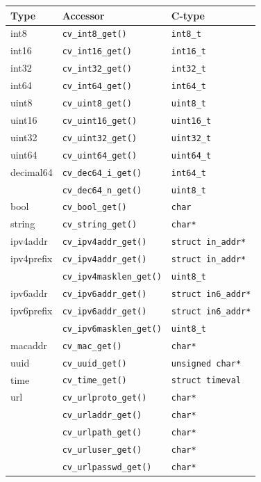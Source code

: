 \documentclass[a4paper, 10pt] {article}
\begin{document}
\begin{tabular}{ | l | l | l | }
\hline
  \textbf{ Type} & \textbf{Accessor} & \textbf{C-type}\\
\hline
int8   & {\tt cv\_int8\_get()}   & {\tt int8\_t} \\
int16  & {\tt cv\_int16\_get()}  & {\tt int16\_t} \\
int32  & {\tt cv\_int32\_get()}  & {\tt int32\_t} \\
int64  & {\tt cv\_int64\_get()}  & {\tt int64\_t} \\
uint8  & {\tt cv\_uint8\_get()}  & {\tt uint8\_t} \\
uint16 & {\tt cv\_uint16\_get()} & {\tt uint16\_t} \\
uint32 & {\tt cv\_uint32\_get()} & {\tt uint32\_t} \\
uint64 & {\tt cv\_uint64\_get()} & {\tt uint64\_t} \\
decimal64 & {\tt cv\_dec64\_i\_get()} & {\tt int64\_t}\\
           & {\tt cv\_dec64\_n\_get()} & {\tt uint8\_t}\\
bool & {\tt cv\_bool\_get()} & {\tt char} \\
string & {\tt cv\_string\_get()} & {\tt char*} \\
ipv4addr   & {\tt cv\_ipv4addr\_get()} & {\tt struct in\_addr*}\\
ipv4prefix & {\tt cv\_ipv4addr\_get()} & {\tt struct in\_addr*}\\
           & {\tt cv\_ipv4masklen\_get()} & {\tt uint8\_t}\\
ipv6addr   & {\tt cv\_ipv6addr\_get()} & {\tt struct in6\_addr*}\\
ipv6prefix & {\tt cv\_ipv6addr\_get()} & {\tt struct in6\_addr*}\\
           & {\tt cv\_ipv6masklen\_get()} & {\tt uint8\_t}\\
macaddr    & {\tt cv\_mac\_get()} & {\tt char*}\\
uuid       & {\tt cv\_uuid\_get()} & {\tt unsigned char*}\\
time       & {\tt cv\_time\_get()} & {\tt struct timeval}\\
url        & {\tt cv\_urlproto\_get()} & {\tt char*}\\
           & {\tt cv\_urladdr\_get()} & {\tt char*}\\
           & {\tt cv\_urlpath\_get()} & {\tt char*}\\
           & {\tt cv\_urluser\_get()} & {\tt char*}\\
           & {\tt cv\_urlpasswd\_get()} & {\tt char*}\\
\hline
\end{tabular}
\end{document}
